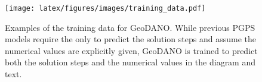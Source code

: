 \begin{figure}[t!]
    \centering
    \texttt{[image: latex/figures/images/training\_data.pdf]}
    \caption{Examples of the training data for GeoDANO. While previous PGPS models require the only to predict the solution steps and assume the numerical values are explicitly given, GeoDANO is trained to predict both the solution steps and the numerical values in the diagram and text.}
    \label{fig:training_data}
\end{figure}